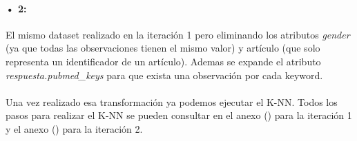\paragraph{• 2: } El mismo dataset realizado en la iteración 1 pero eliminando los atributos \textit{gender} (ya que todas las observaciones tienen el mismo valor) y artículo (que solo representa un identificador de un artículo). Ademas se expande el atributo \textit{respuesta.pubmed\_keys} para que exista una observación por cada keyword.

\paragraph{}
Una vez realizado esa transformación ya podemos ejecutar el K-NN. Todos los pasos para realizar el K-NN se pueden consultar en el anexo () para la iteración 1 y el anexo () para la iteración 2.